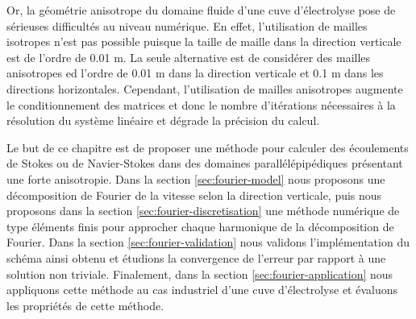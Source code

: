 Or, la géométrie anisotrope du domaine fluide d'une cuve d'électrolyse
pose de sérieuses difficultés au niveau numérique. En effet,
l'utilisation de mailles isotropes n'est pas possible puisque la
taille de maille dans la direction verticale est de l'ordre de
\num{0.01} \si{\meter}.  La seule alternative est de considérer des
mailles anisotropes ed l'ordre de \num{0.01} \si{\meter} dans la
direction verticale et \num{0.1} \si{\meter} dans les directions
horizontales. Cependant, l'utilisation de mailles anisotropes
augmente le conditionnement des matrices et donc le nombre
d'itérations nécessaires à la résolution du système linéaire et
dégrade la précision du calcul.

Le but de ce chapitre est de proposer une méthode pour calculer des
écoulements de Stokes ou de Navier-Stokes dans des domaines
parallélépipédiques présentant une forte anisotropie. Dans la section
\ref{sec:fourier-model} nous proposons une décomposition de Fourier de la
vitesse selon la direction verticale, puis nous proposons dans la
section \ref{sec:fourier-discretisation} une méthode numérique de type éléments
finis pour approcher chaque harmonique de la décomposition de
Fourier. Dans la section \ref{sec:fourier-validation} nous validons
l'implémentation du schéma ainsi obtenu et étudions la convergence de
l'erreur par rapport à une solution non triviale. Finalement, dans la
section \ref{sec:fourier-application} nous appliquons cette méthode au
cas industriel d'une cuve d'électrolyse et évaluons les propriétés de
cette méthode.
